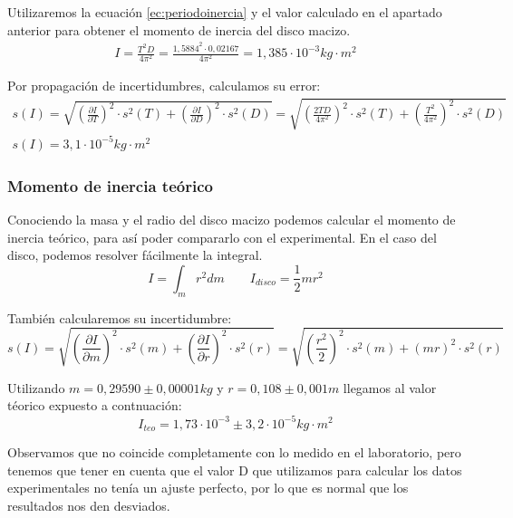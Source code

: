 \documentclass[12pt, a4paper, titlepage]{article}
\begin{document}
  Utilizaremos la ecuación \ref{ec:periodoinercia} y el valor calculado en el apartado anterior para obtener el momento de inercia del disco macizo.
  \begin{gather*}
    I = \frac{T^2 D}{4 \pi^2} = \frac{1,5884^2 \cdot 0,02167}{4 \pi^2} = 1,385 \cdot 10^{-3} kg \cdot m^2
  \end{gather*}

  Por propagación de incertidumbres, calculamos su error:
  \begin{gather}
    s(I) = \sqrt{\left(\frac{\partial I}{\partial T}\right)^2 \cdot s^2(T) + \left(\frac{\partial I}{\partial D}\right)^2 \cdot s^2(D)} = \sqrt{\left(\frac{2 T D}{4 \pi^2}\right)^2 \cdot s^2(T) + \left(\frac{T^2}{4 \pi^2}\right)^2 \cdot s^2(D)} \label{ec:sinexp} \\
    s(I) = 3,1 \cdot 10^{-5} kg \cdot m^2 \nonumber
  \end{gather}

  \subsubsection{Momento de inercia teórico}

  Conociendo la masa y el radio del disco macizo podemos calcular el momento de inercia teórico, para así poder compararlo con el experimental. En el caso del disco, podemos resolver fácilmente la integral.
  \begin{equation}
    I = \int_m{r^2 dm} \qquad I_{disco} = \frac{1}{2} m r^2 \label{ec:minerciateo}
  \end{equation}

  También calcularemos su incertidumbre:
  \begin{equation}
    s(I) = \sqrt{\left(\frac{\partial I}{\partial m}\right)^2 \cdot s^2(m) + \left(\frac{\partial I}{\partial r}\right)^2 \cdot s^2(r)} = \sqrt{\left(\frac{r^2}{2}\right)^2 \cdot s^2(m) + \left(mr\right)^2 \cdot s^2(r)} \label{ec:sminerciateo}
  \end{equation}

  Utilizando $m = 0,29590 \pm 0,00001 kg$ y $r = 0,108 \pm 0,001m$ llegamos al valor téorico expuesto a contnuación:
  \begin{equation*}
    I_{teo} = 1,73 \cdot 10^{-3} \pm 3,2 \cdot 10^{-5} kg \cdot m^2
  \end{equation*}

  Observamos que no coincide completamente con lo medido en el laboratorio, pero tenemos que tener en cuenta que el valor D que utilizamos para calcular los datos experimentales no tenía un ajuste perfecto, por lo que es normal que los resultados nos den desviados.
\end{document}
